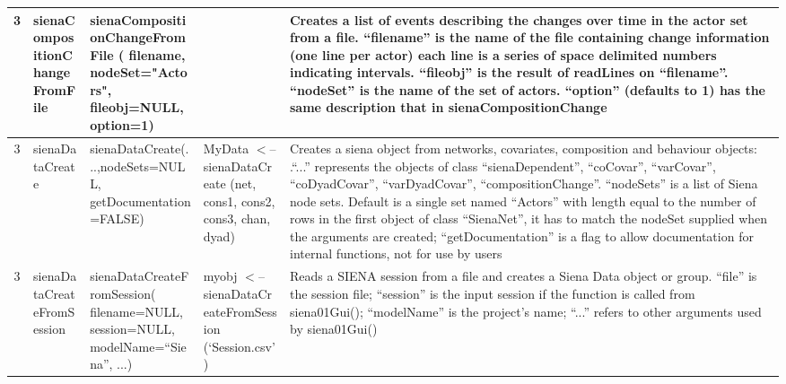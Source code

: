 \documentclass[a4paper,fleqn,11pt]{article}
\newcommand{\+}{\, + \,}
\begin{document}
{\begin{landscape}
\begin{small}
\begin{longtable}{c | p{2.4cm} | p{4.5cm} | p{4.0cm} | p{9.0cm} }
3 & sienaCompositionChangeFromFile & \newline
sienaCompositionChangeFromFile ( filename, \newline
nodeSet="Actors", \newline
fileobj=NULL, option=1) & & Creates a list of events
describing the changes over time in the actor set from a file. ``filename'' is
the name of the file containing change information (one line per actor) each
line is a series of space delimited numbers indicating intervals. ``fileobj''
is the result of readLines on ``filename''. ``nodeSet'' is the name of the set
of actors. ``option'' (defaults to 1) has the same
description that in  sienaCompositionChange\\
\hline

3 & sienaDataCreate & sienaDataCreate(...,\newline nodeSets=NULL, \newline
getDocumentation=FALSE) &
MyData $<$-- \newline
sienaDataCreate (net, \newline cons1, cons2, cons3, \newline
chan, dyad) & Creates a siena object from networks, covariates,
composition and behaviour objects: .``...''  represents the objects of class
``sienaDependent'', ``coCovar'', ``varCovar'', ``coDyadCovar'', ``varDyadCovar'',
``compositionChange''. ``nodeSets'' is a list of Siena node sets. Default is a
single set named ``Actors'' with length equal to the number of rows in the
first object of class ``SienaNet'', it has to match the nodeSet supplied when
the arguments are created; ``getDocumentation'' is a flag to allow
documentation for internal functions,  not for use by users\\
\hline

3 & sienaDataCreateFromSession & \newline
sienaDataCreateFromSession( \newline
filename=NULL, \newline
session=NULL, \newline
modelName=``Siena'', ...) & myobj $<$-- \newline
sienaDataCreateFromSession  \newline
(`Session.csv') & Reads a SIENA session from a file and creates a
Siena Data object or group. ``file'' is the session file; ``session'' is the
input session if the function is called from siena01Gui(); ``modelName'' is the
project's name; ``...'' refers to other
arguments used by siena01Gui()\\
\hline


\end{longtable}
\end{small}
\end{landscape}}
\end{document}
